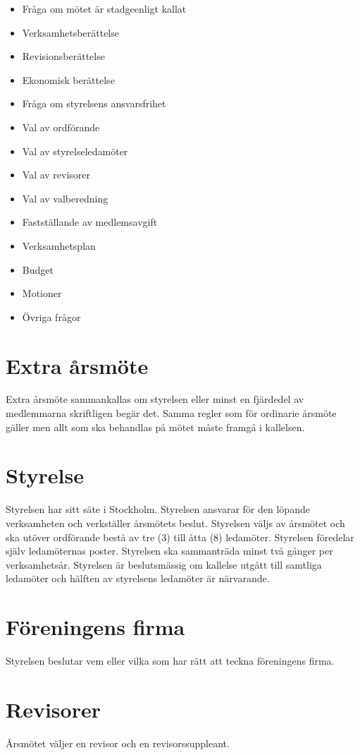 \documentclass[a4paper,11pt,oneside]{article}
\begin{document}
\begin{itemize}
  \item{Fråga om mötet är stadgeenligt kallat}
  \item{Verksamhetsberättelse}
  \item{Revisionsberättelse}
  \item{Ekonomisk berättelse}
  \item{Fråga om styrelsens ansvarsfrihet}
  \item{Val av ordförande}
  \item{Val av styrelseledamöter}
  \item{Val av revisorer}
  \item{Val av valberedning}
  \item{Fastställande av medlemsavgift}
  \item{Verksamhetsplan}
  \item{Budget}
  \item{Motioner}
  \item{Övriga frågor}
\end{itemize}

\section{Extra årsmöte}
Extra årsmöte sammankallas om styrelsen eller minst en fjärdedel av medlemmarna
skriftligen begär det. Samma regler som för ordinarie årsmöte gäller men allt
som ska behandlas på mötet måste framgå i kallelsen.

\section{Styrelse}
Styrelsen har sitt säte i Stockholm. Styrelsen ansvarar för den löpande
verksamheten och verkställer årsmötets beslut. Styrelsen väljs av årsmötet och
ska utöver ordförande bestå av tre (3) till åtta (8) ledamöter. Styrelsen
föredelar själv ledamöternas poster. Styrelsen ska sammanträda minst två gånger
per verksamhetsår. Styrelsen är beslutsmässig om kallelse utgått till samtliga
ledamöter och hälften av styrelsens ledamöter är närvarande.

\section{Föreningens firma}
Styrelsen beslutar vem eller vilka som har rätt att teckna föreningens firma.

\section{Revisorer}
Årsmötet väljer en revisor och en revisorssuppleant.
\end{document}
